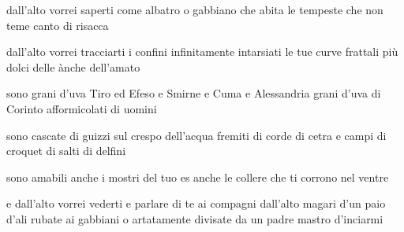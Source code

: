 \begin{poem}
	\begin{stanza}
		dall’alto vorrei saperti\verseline
		come albatro o gabbiano\verseline
		che abita le tempeste\verseline
		che non teme canto di risacca
	\end{stanza}

	\begin{stanza}
		dall’alto vorrei tracciarti\verseline
		i confini infinitamente intarsiati\verseline
		le tue curve frattali\verseline
		più dolci delle ànche dell’amato
	\end{stanza}

	\begin{stanza}
		sono grani d’uva Tiro\verseline
		ed Efeso e Smirne\verseline
		e Cuma e Alessandria\verseline
		grani d’uva di Corinto\verseline
		afformicolati di uomini
	\end{stanza}

	\begin{stanza}
		sono cascate di guizzi\verseline
		sul crespo dell’acqua\verseline
		fremiti di corde di cetra\verseline
		e campi di croquet\verseline
		di salti di delfini
	\end{stanza}

	\begin{stanza}
		sono amabili\verseline
		anche i mostri del tuo es\verseline
		anche le collere\verseline
		che ti corrono nel ventre
	\end{stanza}

	\begin{stanza}
		e dall’alto vorrei vederti\verseline
		e parlare di te ai compagni\verseline
		dall’alto magari d’un paio\verseline
		d’ali rubate ai gabbiani\verseline
		o artatamente divisate\verseline
		da un padre\verseline
		mastro d’inciarmi
	\end{stanza}
\end{poem}

\clearpage


